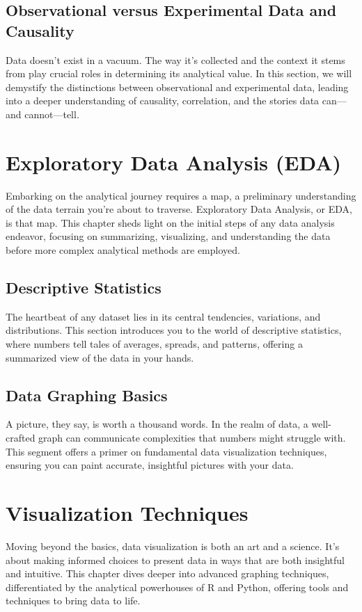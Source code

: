 \documentclass[a4paper,12pt]{book}
\begin{document}
\section{Observational versus Experimental Data and Causality}
Data doesn't exist in a vacuum. The way it's collected and the context it stems from play crucial roles in determining its analytical value. In this section, we will demystify the distinctions between observational and experimental data, leading into a deeper understanding of causality, correlation, and the stories data can—and cannot—tell.

\chapter{Exploratory Data Analysis (EDA)}
Embarking on the analytical journey requires a map, a preliminary understanding of the data terrain you're about to traverse. Exploratory Data Analysis, or EDA, is that map. This chapter sheds light on the initial steps of any data analysis endeavor, focusing on summarizing, visualizing, and understanding the data before more complex analytical methods are employed.

\section{Descriptive Statistics}
The heartbeat of any dataset lies in its central tendencies, variations, and distributions. This section introduces you to the world of descriptive statistics, where numbers tell tales of averages, spreads, and patterns, offering a summarized view of the data in your hands.

\section{Data Graphing Basics}
A picture, they say, is worth a thousand words. In the realm of data, a well-crafted graph can communicate complexities that numbers might struggle with. This segment offers a primer on fundamental data visualization techniques, ensuring you can paint accurate, insightful pictures with your data.

\chapter{Visualization Techniques}
Moving beyond the basics, data visualization is both an art and a science. It's about making informed choices to present data in ways that are both insightful and intuitive. This chapter dives deeper into advanced graphing techniques, differentiated by the analytical powerhouses of R and Python, offering tools and techniques to bring data to life.
\end{document}
